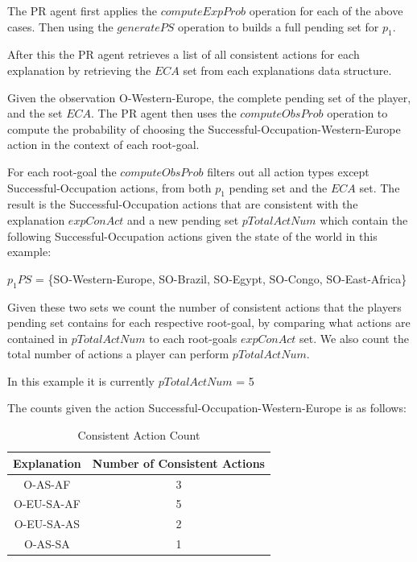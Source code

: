 \documentclass[parskip]{cs4rep}
\begin{document}
The PR agent first applies the $computeExpProb$ operation for each of the above cases. Then using the $generatePS$ operation to builds a full pending set for $p_1$.

After this the PR agent retrieves a list of all consistent actions for each explanation by retrieving the $ECA$ set from each explanations data structure.

Given the observation O-Western-Europe, the complete pending set of the player, and the set $ECA$. The PR agent then uses the $computeObsProb$ operation to compute the probability of choosing the Successful-Occupation-Western-Europe action in the context of each root-goal.

For each root-goal the $computeObsProb$ filters out all action types except Successful-Occupation actions, from both $p_1$ pending set and the $ECA$ set. The result is the Successful-Occupation actions that are consistent with the explanation $expConAct$ and a new pending set $pTotalActNum$ which contain the following Successful-Occupation actions given the state of the world in this example:\newline

\centerline{
$p_1PS$ = \{SO-Western-Europe, SO-Brazil, SO-Egypt, SO-Congo, SO-East-Africa\}
}

Given these two sets we count the number of consistent actions that the players pending set contains for each respective root-goal, by comparing what actions are contained in $pTotalActNum$ to each root-goals $expConAct$ set. We also count the total number of actions a player can perform $pTotalActNum$.

In this example it is currently $pTotalActNum$ = 5

The counts given the action Successful-Occupation-Western-Europe is as follows:

\begin{table}[ht]
\centering
\begin{tabular}{|c|c|}
\hline 
\textbf{Explanation} & \textbf{Number of Consistent Actions} \\ 
\hline 
O-AS-AF & 3 \\ 
\hline 
O-EU-SA-AF & 5 \\ 
\hline 
O-EU-SA-AS & 2 \\ 
\hline 
O-AS-SA & 1 \\ 
\hline 
\end{tabular}
\caption{Consistent Action Count}
\label{table:consistent-action-count}
\end{table}
\end{document}
